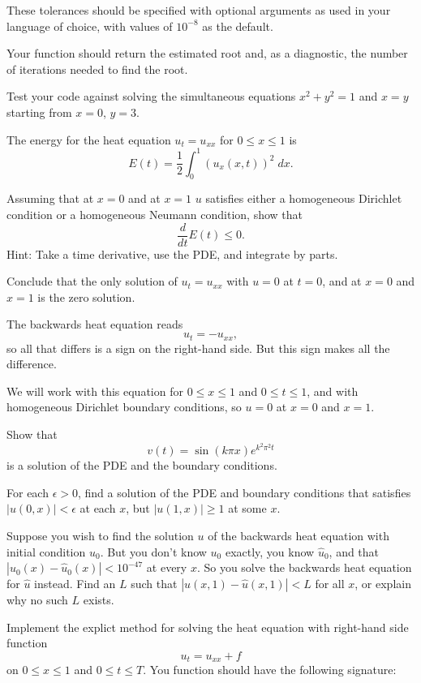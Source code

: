 \documentclass[minion]{homework}
\begin{document}
\begin{problems}
These tolerances should be specified with optional arguments 
as used in your language of choice, with values of $10^{-8}$ as the default.

Your function should return the estimated root and, as a diagnostic, the number of iterations needed to find the root.

Test your code against solving the simultaneous equations
$x^2+y^2=1$ and $x=y$ starting from $x=0$, $y=3$.  

\problem The energy for the heat equation $u_t=u_{xx}$ 
for $0\le x\le 1$ is
\[
E(t) = \frac{1}{2}\int_0^1 (u_x(x,t))^2\;dx.
\]
\begin{subproblems}
\item Assuming that at $x=0$ and at $x=1$ $u$ satisfies either
a homogeneous Dirichlet condition or a homogeneous Neumann condition,
show that
\[
\frac{d}{dt} E(t) \le 0.
\]
Hint: Take a time derivative, use the PDE, and integrate by parts.
\item Conclude that the only solution of $u_t=u_{xx}$ with $u=0$
at $t=0$, and at $x=0$ and $x=1$ is the zero solution.
\end{subproblems}

\problem The backwards heat equation reads
\[
u_t = -u_{xx},
\]
so all that differs is a sign on the right-hand side.  But this sign makes all the difference.

We will work with this equation for $0\le x \le 1$ and $0\le t\le 1$, and
with homogeneous Dirichlet boundary conditions, so $u=0$ at $x=0$ and $x=1$.
\begin{subproblems}
\item Show that 
\[
v(t) = \sin(k\pi x) e^{k^2\pi^2 t}
\]
is a solution of the PDE and the boundary conditions.
\item For each $\epsilon>0$, find a solution of the PDE and boundary conditions
that satisfies $|u(0,x)|<\epsilon$ at each $x$, but $|u(1,x)|\ge 1$ at some $x$.
\item Suppose you wish to find the solution $u$ of the backwards heat equation with initial condition $u_0$.  But you don't know $u_0$ exactly, you know $\hat u_0$,
and that $|u_0(x)-\hat u_0(x)|<10^{-47}$ at every $x$.  So you solve the
backwards heat equation for $\hat u$ instead.
Find an $L$ such that $|u(x,1)-\hat u(x,1)|<L$ for all $x$, or
explain why no such $L$ exists.
\end{subproblems}

\problem Implement the explict method for solving the heat equation with
right-hand side function
\[
u_t=u_{xx} + f
\]
on $0\le x \le 1$ and $0\le t\le T$.  You function should have
the following signature:


\end{problems}
\end{document}
